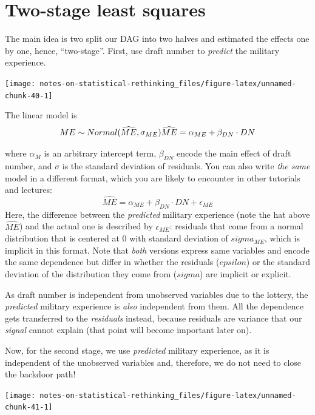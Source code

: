 \documentclass[
]{book}
\begin{document}
\hypertarget{two-stage-least-squares}{%
\section*{Two-stage least squares}\label{two-stage-least-squares}}

The main idea is two split our DAG into two halves and estimated the effects one by one, hence, ``two-stage''. First, use draft number to \emph{predict} the military experience.

\begin{center}\texttt{[image: notes-on-statistical-rethinking\_files/figure-latex/unnamed-chunk-40-1]} \end{center}

The linear model is
\[ME \sim Normal(\widehat{ME}, \sigma_{ME})\\
\widehat{ME} = \alpha_{ME} + \beta_{DN} \cdot DN\]

where \(\alpha_M\) is an arbitrary intercept term, \(\beta_{DN}\) encode the main effect of draft number, and \(\sigma\) is the standard deviation of residuals. You can also write \emph{the same} model in a different format, which you are likely to encounter in other tutorials and lectures:
\[\widehat{ME} = \alpha_{ME} + \beta_{DN} \cdot DN + \epsilon_{ME}\]
Here, the difference between the \emph{predicted} military experience (note the hat above \(\widehat{ME}\)) and the actual one is described by \(\epsilon_{ME}\): residuals that come from a normal distribution that is centered at 0 with standard deviation of \(sigma_{ME}\), which is implicit in this format. Note that \emph{both} versions express same variables and encode the same dependence but differ in whether the residuals (\(epsilon\)) or the standard deviation of the distribution they come from (\(sigma\)) are implicit or explicit.

As draft number is independent from unobserved variables due to the lottery, the \emph{predicted} military experience is \emph{also} independent from them. All the dependence gets transferred to the \emph{residuals} instead, because residuals are variance that our \emph{signal} cannot explain (that point will become important later on).

Now, for the second stage, we use \emph{predicted} military experience, as it is independent of the unobserved variables and, therefore, we do not need to close the backdoor path!

\begin{center}\texttt{[image: notes-on-statistical-rethinking\_files/figure-latex/unnamed-chunk-41-1]} \end{center}
\end{document}
